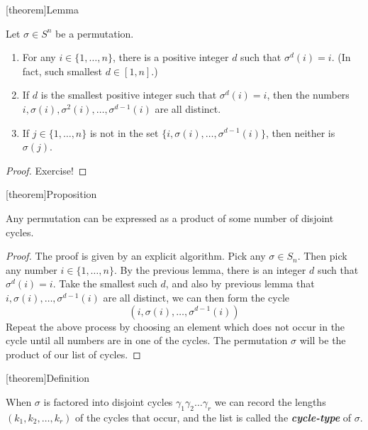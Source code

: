 \documentclass[12pt]{report}
\theoremstyle{definition}
\begin{document}
[theorem]{Lemma}
\begin{permutation's lemma}
    Let $\sigma \in S^{n}$ be a permutation.
    \begin{enumerate}
        \item For any $i \in \{1, \ldots, n\}$, there is a positive integer $d$
            such that $\sigma^{d}(i) = i$. (In fact, such smallest $d \in [1, n]$.)

        \item If $d$ is the smallest positive integer such that $\sigma^{d}(i) = i$,
            then the numbers $i, \sigma(i), \sigma^{2}(i), \ldots, \sigma^{d-1}(i)$
            are all distinct.

        \item If $j \in \{1, \ldots, n\}$ is not in the set $\{i, \sigma(i), \ldots,
            \sigma^{d-1}(i)\}$, then neither is $\sigma(j)$.
    \end{enumerate}
\end{permutation's lemma}

\begin{proof}
    Exercise!
\end{proof}

[theorem]{Proposition}
\begin{permutation expressed as disjoint cycles}
    Any permutation can be expressed as a product of some number of disjoint cycles.
\end{permutation expressed as disjoint cycles}

\begin{proof}
    The proof is given by an explicit algorithm.
    Pick any $\sigma \in S_n$. Then pick any number $i \in \{1, \ldots, n\}$.
    By the previous lemma, there is an integer $d$ such that $\sigma^{d}(i) = i$.
    Take the smallest such $d$, and also by previous lemma that 
    $i, \sigma(i), \ldots, \sigma^{d-1}(i)$ are all distinct, we can then form the cycle\[
        (i, \sigma(i), \ldots, \sigma^{d-1}(i))
    \]Repeat the above process by choosing an element which does not occur in the cycle
    until all numbers are in one of the cycles.
    The permutation $\sigma$ will be the product of our list of cycles.
\end{proof}

[theorem]{Definition}
\begin{cycle-type}
    When $\sigma$ is factored into disjoint cycles $\gamma_1\gamma_2\ldots\gamma_r$
    we can record the lengths $(k_1, k_2,\ldots, k_r)$ of the cycles that occur,
    and the list is called the \textbf{\emph{cycle-type}} of $\sigma$.
\end{cycle-type}
\end{document}
